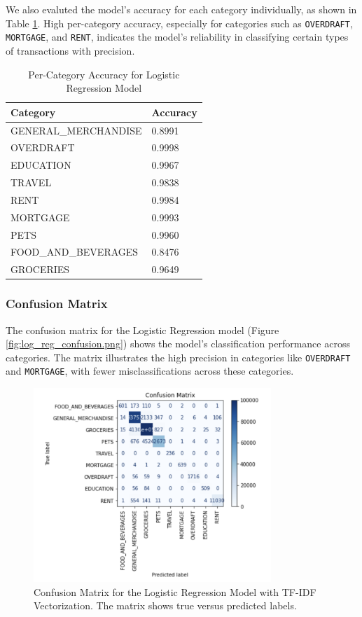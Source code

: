 \documentclass[12pt,letterpaper]{article}
\begin{document}
We also evaluted the model’s accuracy for each category individually, as shown in Table \ref{table:category_accuracy_logreg}. High per-category accuracy, especially for categories such as \texttt{OVERDRAFT}, \texttt{MORTGAGE}, and \texttt{RENT}, indicates the model's reliability in classifying certain types of transactions with precision.

\begin{table}[h]
    \centering
    \begin{tabular}{ll}
        \hline
        \textbf{Category} & \textbf{Accuracy} \\
        \hline
        GENERAL\_MERCHANDISE & 0.8991 \\
        OVERDRAFT & 0.9998 \\
        EDUCATION & 0.9967 \\
        TRAVEL & 0.9838 \\
        RENT & 0.9984 \\
        MORTGAGE & 0.9993 \\
        PETS & 0.9960 \\
        FOOD\_AND\_BEVERAGES & 0.8476 \\
        GROCERIES & 0.9649 \\
        \hline
    \end{tabular}
    \caption{Per-Category Accuracy for Logistic Regression Model}
    \label{table:category_accuracy_logreg}
\end{table}

\subsubsection{Confusion Matrix}
The confusion matrix for the Logistic Regression model (Figure \ref{fig:log_reg_confusion.png}) shows the model's classification performance across categories. The matrix illustrates the high precision in categories like \texttt{OVERDRAFT} and \texttt{MORTGAGE}, with fewer misclassifications across these categories. 

\begin{figure}[h]
    \centering
    \includegraphics[width=0.8\textwidth]{figure/log_reg_confusion.png}
    \caption{Confusion Matrix for the Logistic Regression Model with TF-IDF Vectorization. The matrix shows true versus predicted labels.}
    \label{fig:confusion_matrix_logreg}
\end{figure}
\end{document}
